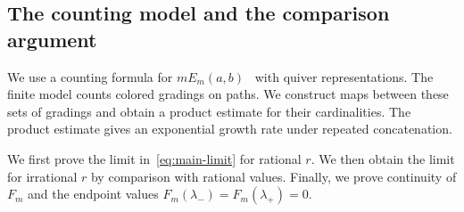 \subsection{The counting model and the comparison argument}
We use a counting formula for $mE_m(a,b)$~\cite{B} with quiver representations.
The finite model counts colored gradings on paths.
We construct maps between these sets of gradings and obtain a product estimate for their cardinalities.
The product estimate gives an exponential growth rate under repeated concatenation.

We first prove the limit in~\eqref{eq:main-limit} for rational $r$.
We then obtain the limit for irrational $r$ by comparison with rational values.
Finally, we prove continuity of $F_m$ and the endpoint values
$F_m(\lambda_-)=F_m(\lambda_+)=0$.

